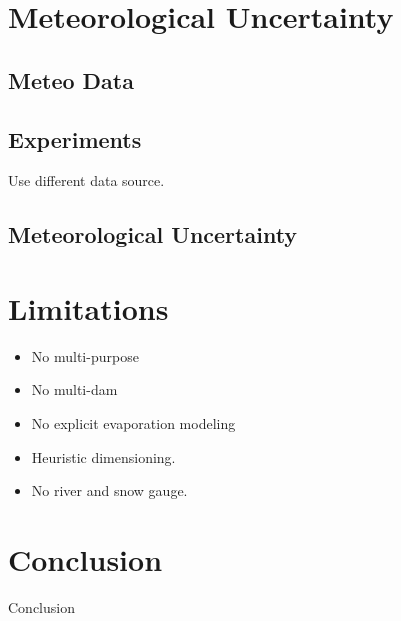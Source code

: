 \documentclass{article}
\begin{document}
\section{Meteorological Uncertainty}
\label{sec:Meteorological Uncertainty}

\subsection{Meteo Data}
\label{sec:Meteo Data}

\subsection{Experiments}
\label{sec:Meteo Experiments}

Use different data source.


\subsection{Meteorological Uncertainty}

\section{Limitations}

\begin{itemize}
	\item No multi-purpose
	\item No multi-dam
 	\item No explicit evaporation modeling
	\item Heuristic dimensioning.
	\item No river and snow gauge.  
\end{itemize}

\section{Conclusion}
\label{sec:Conclusion}

Conclusion





\end{document}

